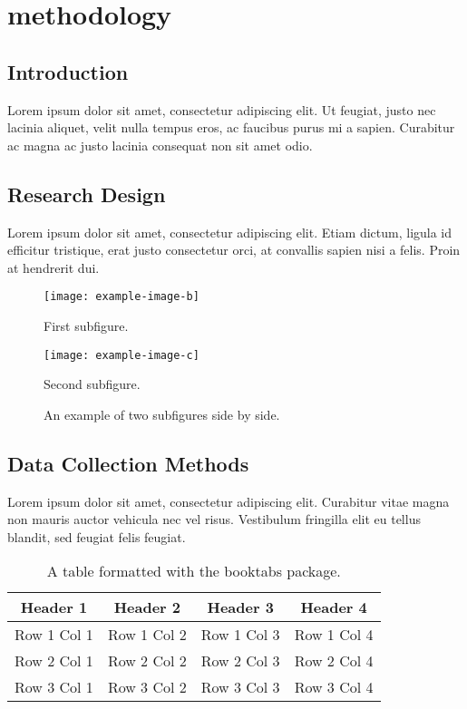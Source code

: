 \chapter{methodology}
\section{Introduction}
Lorem ipsum dolor sit amet, consectetur adipiscing elit. Ut feugiat, justo nec lacinia aliquet, velit nulla tempus eros, ac faucibus purus mi a sapien. Curabitur ac magna ac justo lacinia consequat non sit amet odio.

\section{Research Design}
Lorem ipsum dolor sit amet, consectetur adipiscing elit. Etiam dictum, ligula id efficitur tristique, erat justo consectetur orci, at convallis sapien nisi a felis. Proin at hendrerit dui.
\begin{figure}[ht]
        \texttt{[image: example-image-b]}
        \caption{First subfigure.}
        \label{fig:sub1}
\end{figure}
\begin{figure}
        \texttt{[image: example-image-c]}
        \caption{Second subfigure.}
        \label{fig:sub2}
    \caption{An example of two subfigures side by side.}
    \label{fig:sidebyside}
\end{figure}
\section{Data Collection Methods}
Lorem ipsum dolor sit amet, \cite{wikipedia2023artificial}consectetur adipiscing elit. Curabitur vitae magna non mauris auctor vehicula nec vel risus. Vestibulum fringilla elit eu tellus blandit, sed feugiat felis feugiat.
\begin{table}[ht]
    \centering
    \begin{tabular}{cccc}
        \toprule
        Header 1 & Header 2 & Header 3 & Header 4 \\
        \midrule
        Row 1 Col 1 & Row 1 Col 2 & Row 1 Col 3 & Row 1 Col 4 \\
        Row 2 Col 1 & Row 2 Col 2 & Row 2 Col 3 & Row 2 Col 4 \\
        Row 3 Col 1 & Row 3 Col 2 & Row 3 Col 3 & Row 3 Col 4 \\
        \bottomrule
    \end{tabular}
    \caption{A table formatted with the booktabs package.}
    \label{tab:booktabs}
\end{table}
